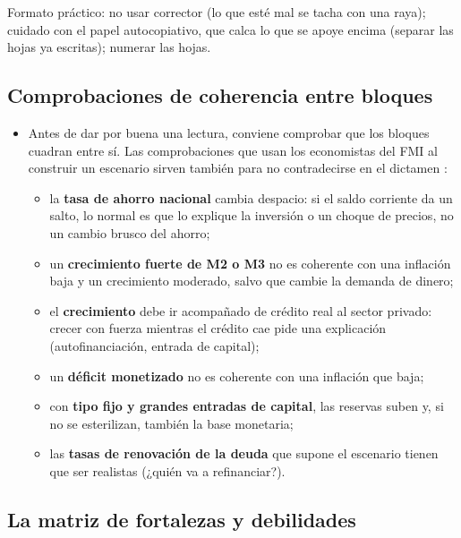 \documentclass[11pt]{article}
\begin{document}
\begin{notaopositor}
Formato práctico: no usar corrector (lo que esté mal se tacha con una raya); cuidado con el papel autocopiativo, que calca lo que se apoye encima (separar las hojas ya escritas); numerar las hojas.
\end{notaopositor}

\subsection{Comprobaciones de coherencia entre bloques}\label{anexo:coherencia}

\begin{itemize}
\item Antes de dar por buena una lectura, conviene comprobar que los bloques cuadran entre sí. Las comprobaciones que usan los economistas del FMI al construir un escenario sirven también para no contradecirse en el dictamen \parencite{FMI2013CaseStudy}:
  \begin{itemize}
  \item la \textbf{tasa de ahorro nacional} cambia despacio: si el saldo corriente da un salto, lo normal es que lo explique la inversión o un choque de precios, no un cambio brusco del ahorro;
  \item un \textbf{crecimiento fuerte de M2 o M3} no es coherente con una inflación baja y un crecimiento moderado, salvo que cambie la demanda de dinero;
  \item el \textbf{crecimiento} debe ir acompañado de crédito real al sector privado: crecer con fuerza mientras el crédito cae pide una explicación (autofinanciación, entrada de capital);
  \item un \textbf{déficit monetizado} no es coherente con una inflación que baja;
  \item con \textbf{tipo fijo y grandes entradas de capital}, las reservas suben y, si no se esterilizan, también la base monetaria;
  \item las \textbf{tasas de renovación de la deuda} que supone el escenario tienen que ser realistas (¿quién va a refinanciar?).
  \end{itemize}
\end{itemize}

\subsection{La matriz de fortalezas y debilidades}\label{anexo:matriz}
\end{document}
